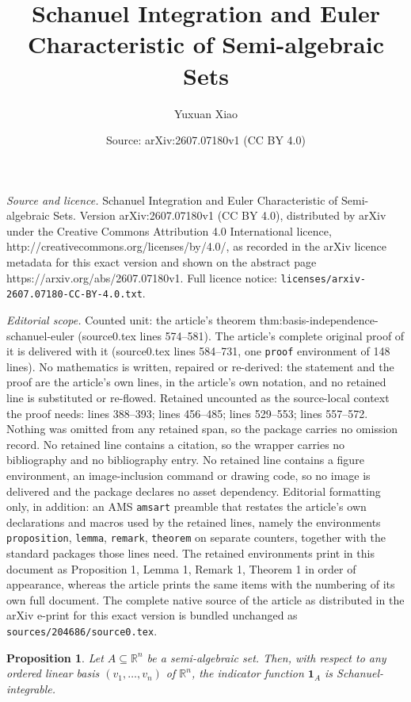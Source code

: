 \documentclass[10pt,a4paper]{amsart}
\title{Schanuel Integration and Euler Characteristic of Semi-algebraic Sets}
\author{Yuxuan Xiao}
\date{Source: arXiv:2607.07180v1 (CC BY 4.0)}
\newtheorem{proposition}{Proposition}
\begin{document}
\maketitle

\noindent\emph{Source and licence.} Schanuel Integration and Euler Characteristic of Semi-algebraic Sets. Version arXiv:2607.07180v1 (CC BY 4.0), distributed by arXiv under the Creative Commons Attribution 4.0 International licence, http://creativecommons.org/licenses/by/4.0/, as recorded in the arXiv licence metadata for this exact version and shown on the abstract page https://arxiv.org/abs/2607.07180v1. Full licence notice: \texttt{licenses/arxiv-2607.07180-CC-BY-4.0.txt}.\par\smallskip

\noindent\textit{Editorial scope.} Counted unit: the article's theorem thm:basis-independence-schanuel-euler (source0.tex lines 574--581). The article's complete original proof of it is delivered with it (source0.tex lines 584--731, one \texttt{proof} environment of 148 lines). No mathematics is written, repaired or re-derived: the statement and the proof are the article's own lines, in the article's own notation, and no retained line is substituted or re-flowed.  Retained uncounted as the source-local context the proof needs: lines 388--393; lines 456--485; lines 529--553; lines 557--572.  Nothing was omitted from any retained span, so the package carries no omission record.  No retained line contains a citation, so the wrapper carries no bibliography and no bibliography entry.  No retained line contains a figure environment, an image-inclusion command or drawing code, so no image is delivered and the package declares no asset dependency.  Editorial formatting only, in addition: an AMS \texttt{amsart} preamble that restates the article's own declarations and macros used by the retained lines, namely the environments \texttt{proposition}, \texttt{lemma}, \texttt{remark}, \texttt{theorem} on separate counters, together with the standard packages those lines need.  The retained environments print in this document as Proposition 1, Lemma 1, Remark 1, Theorem 1 in order of appearance, whereas the article prints the same items with the numbering of its own full document.  The complete native source of the article as distributed in the arXiv e-print for this exact version is bundled unchanged as \texttt{sources/204686/source0.tex}.
\begin{proposition}
\label{prop:semialgebraic-indicator-schanuel-integrable}
Let \(A\subseteq \mathbb{R}^n\) be a semi-algebraic set.  Then, with respect to
any ordered linear basis \((v_1,\ldots,v_n)\) of \(\mathbb{R}^n\), the
indicator function \(\mathbf{1}_A\) is Schanuel-integrable.
\end{proposition}
\end{document}

